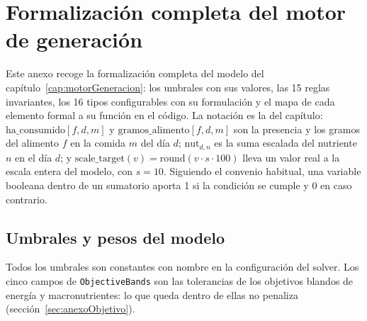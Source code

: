 \chapter{Formalización completa del motor de generación}
\label{apendice:formalizacion}

Este anexo recoge la formalización completa del modelo del capítulo~\ref{cap:motorGeneracion}: los umbrales con sus valores, las 15 reglas invariantes, los 16 tipos configurables con su formulación y el mapa de cada elemento formal a su función en el código. La notación es la del capítulo: $\text{ha\_consumido}[f,d,m]$ y $\text{gramos\_alimento}[f,d,m]$ son la presencia y los gramos del alimento $f$ en la comida $m$ del día $d$; $\text{nut}_{d,n}$ es la suma escalada del nutriente $n$ en el día $d$; y $\text{scale\_target}(v) = \text{round}(v \cdot s \cdot 100)$ lleva un valor real a la escala entera del modelo, con $s = 10$. Siguiendo el convenio habitual, una variable booleana dentro de un sumatorio aporta 1 si la condición se cumple y 0 en caso contrario.

\section{Umbrales y pesos del modelo}
\label{sec:anexoUmbrales}

Todos los umbrales son constantes con nombre en la configuración del solver. Los cinco campos de \texttt{ObjectiveBands} son las tolerancias de los objetivos blandos de energía y macronutrientes: lo que queda dentro de ellas no penaliza (sección~\ref{sec:anexoObjetivo}).

